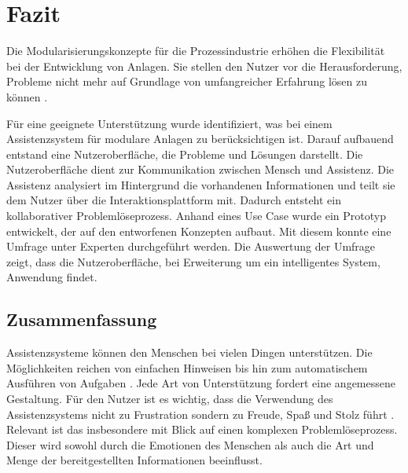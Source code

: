 \chapter{Fazit}
\label{Zusammenfassung}
Die Modularisierungskonzepte für die Prozessindustrie erhöhen die Flexibilität bei der Entwicklung von Anlagen. Sie stellen den Nutzer vor die Herausforderung, Probleme nicht mehr auf Grundlage von umfangreicher Erfahrung lösen zu können \cite{Muller2018}.

Für eine geeignete Unterstützung wurde identifiziert, was bei einem Assistenzsystem für modulare Anlagen zu berücksichtigen ist. Darauf aufbauend entstand eine Nutzeroberfläche, die Probleme und Lösungen darstellt. Die Nutzeroberfläche dient zur Kommunikation zwischen Mensch und Assistenz. Die Assistenz analysiert im Hintergrund die vorhandenen Informationen und teilt sie dem Nutzer über die Interaktionsplattform mit. Dadurch entsteht ein kollaborativer Problemlöseprozess. Anhand eines Use Case wurde ein Prototyp entwickelt, der auf den entworfenen Konzepten aufbaut. Mit diesem konnte eine Umfrage unter Experten durchgeführt werden. Die Auswertung der Umfrage zeigt, dass die Nutzeroberfläche, bei Erweiterung um ein intelligentes System, Anwendung findet.

\section{Zusammenfassung}
Assistenzsysteme können den Menschen bei vielen Dingen unterstützen. Die Möglichkeiten reichen von einfachen Hinweisen bis hin zum automatischem Ausführen von Aufgaben \cite{Wandke2005}. Jede Art von Unterstützung fordert eine angemessene Gestaltung. Für den Nutzer ist es wichtig, dass die Verwendung des Assistenzsystems nicht zu Frustration sondern zu Freude, Spaß und Stolz führt \cite{Hassenzahl2008}. Relevant ist das insbesondere mit Blick auf einen komplexen Problemlöseprozess. Dieser wird sowohl durch die Emotionen des Menschen als auch die Art und Menge der bereitgestellten Informationen beeinflusst. 


